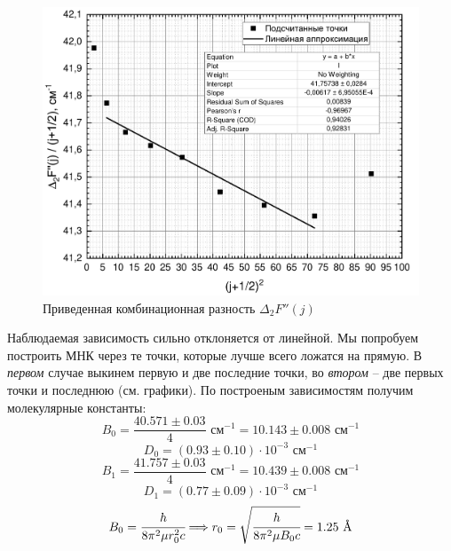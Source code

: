 \begin{figure}[H]
	\vspace{-0.8cm}
	\centering
	\includegraphics[height=0.49\textheight]{data/delta_F''_j_sq}
	\vspace{-0.3cm}
	\caption{Приведенная комбинационная разность $\Delta_2F''(j)$}
	\label{deltaF''_j}
\end{figure}

Наблюдаемая зависимость сильно отклоняется от линейной. Мы попробуем построить МНК через те точки, которые лучше всего ложатся на прямую. В \textit{первом} случае выкинем первую и две последние точки, во \textit{втором} -- две первых точки и последнюю (см. графики). По построеным зависимостям
получим молекулярные константы:
\begin{equation}
B_0 = \dfrac{40.571 \pm 0.03}{4} \text{ см}^{-1}
= 10.143 \pm 0.008 \text{ см$^{-1}$}
\end{equation}
\begin{equation}
D_0 = (0.93 \pm 0.10) \cdot 10^{-3} \text{ см$^{-1}$}
\end{equation}
\begin{equation}
B_1 = \dfrac{41.757 \pm 0.03}{4} \text{ см}^{-1}
= 10.439 \pm 0.008 \text{ см$^{-1}$}
\end{equation}
\begin{equation}
D_1 = (0.77 \pm 0.09) \cdot 10^{-3} \text{ см$^{-1}$}
\end{equation}
\begin{equation}
B_0 = \cfrac{h}{8\pi^2\mu r_0^2c} \Longrightarrow
r_0 = \sqrt{\cfrac{h}{8\pi^2\mu B_0 c}} = 1.25 \text{ \AA}
\end{equation}


